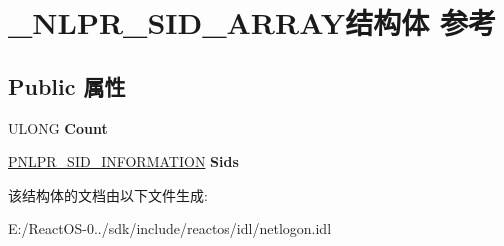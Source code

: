 \hypertarget{struct___n_l_p_r___s_i_d___a_r_r_a_y}{}\section{\+\_\+\+N\+L\+P\+R\+\_\+\+S\+I\+D\+\_\+\+A\+R\+R\+A\+Y结构体 参考}
\label{struct___n_l_p_r___s_i_d___a_r_r_a_y}
\subsection*{Public 属性}
\begin{DoxyCompactItemize}
\item 
\mbox{\label{struct___n_l_p_r___s_i_d___a_r_r_a_y_a17cb54fed4142e169ecfae46dcf44696}} 
U\+L\+O\+NG {\bfseries Count}
\item 
\mbox{\label{struct___n_l_p_r___s_i_d___a_r_r_a_y_acc921d123c02dbdb85b36a50c1cf2967}} 
\hyperlink{struct___n_l_p_r___s_i_d___i_n_f_o_r_m_a_t_i_o_n}{P\+N\+L\+P\+R\+\_\+\+S\+I\+D\+\_\+\+I\+N\+F\+O\+R\+M\+A\+T\+I\+ON} {\bfseries Sids}
\end{DoxyCompactItemize}


该结构体的文档由以下文件生成\+:\begin{DoxyCompactItemize}
\item 
E\+:/\+React\+O\+S-\/0../sdk/include/reactos/idl/netlogon.\+idl\end{DoxyCompactItemize}
